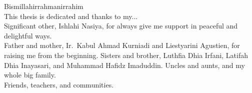 \noindent Bismillahirrahmanirrahim
\\

\noindent This thesis is dedicated and thanks to my...
\\

\noindent Significant other, Ishlahi Nasiya, for always give me support in peaceful and delightful ways.
\\

\noindent Father and mother, Ir.\ Kabul Ahmad Kurniadi and Liestyarini Agustien, for raising me from the beginning.
Sisters and brother, Luthfia Dhia Irfani, Latifah Dhia Inayasari, and Muhammad Hafidz Imaduddin.
Uncles and aunts, and my whole big family.
\\

\noindent Friends, teachers, and communities.

